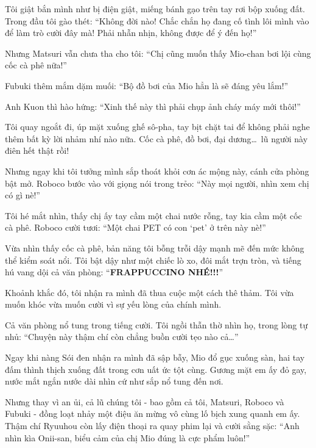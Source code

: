 \documentclass[../main.tex]{subfiles}
\begin{document}
Tôi giật bắn mình như bị điện giật, miếng bánh gạo trên tay rơi bộp xuống đất. Trong đầu tôi gào thét: ``Không đời nào! Chắc chắn họ đang cố tình lôi mình vào để làm trò cười đây mà! Phải nhẫn nhịn, không được để ý đến họ!''


Nhưng Matsuri vẫn chưa tha cho tôi: ``Chị cũng muốn thấy Mio-chan bơi lội cùng cốc cà phê nữa!''


Fubuki thêm mắm dặm muối: ``Bộ đồ bơi của Mio hẳn là sẽ đáng yêu lắm!''

Anh Kuon thì hào hứng: ``Xinh thế này thì phải chụp ảnh cháy máy mới thôi!''

Tôi quay ngoắt đi, úp mặt xuống ghế sô-pha, tay bịt chặt tai để không phải nghe thêm bất kỳ lời nhảm nhí nào nữa. Cốc cà phê, đồ bơi, đại dương\dots\ lũ người này điên hết thật rồi!

Nhưng ngay khi tôi tưởng mình sắp thoát khỏi cơn ác mộng này, cánh cửa phòng bật mở. Roboco bước vào với giọng nói trong trẻo: ``Này mọi người, nhìn xem chị có gì nè!''

Tôi hé mắt nhìn, thấy chị ấy tay cầm một chai nước rỗng, tay kia cầm một cốc cà phê. Roboco cười tươi: ``Một chai PET có con `pet' ở trên này nè!''


Vừa nhìn thấy cốc cà phê, bản năng tôi bỗng trỗi dậy mạnh mẽ đến mức không thể kiểm soát nổi. Tôi bật dậy như một chiếc lò xo, đôi mắt trợn tròn, và tiếng hú vang dội cả văn phòng: ``\textbf{FRAPPUCCINO NHÉ!!!}''

Khoảnh khắc đó, tôi nhận ra mình đã thua cuộc một cách thê thảm. Tôi vừa muốn khóc vừa muốn cười vì sự yếu lòng của chính mình.


Cả văn phòng nổ tung trong tiếng cười. Tôi ngồi thẫn thờ nhìn họ, trong lòng tự nhủ: ``Chuyện này thậm chí còn chẳng buồn cười tẹo nào cả\dots''

\omk
{}

Ngay khi nàng Sói đen nhận ra mình đã sập bẫy, Mio đổ gục xuống sàn, hai tay đấm thình thịch xuống đất trong cơn uất ức tột cùng. Gương mặt em ấy đỏ gay, nước mắt ngắn nước dài nhìn cứ như sắp nổ tung đến nơi.


Nhưng thay vì an ủi, cả lũ chúng tôi - bao gồm cả tôi, Matsuri, Roboco và Fubuki - đồng loạt nhảy một điệu ăn mừng vô cùng lố bịch xung quanh em ấy. Thậm chí Ryuuhou còn lấy điện thoại ra quay phim lại và cười sằng sặc: ``Anh nhìn kìa Onii-san, biểu cảm của chị Mio đúng là cực phẩm luôn!''
\end{document}

